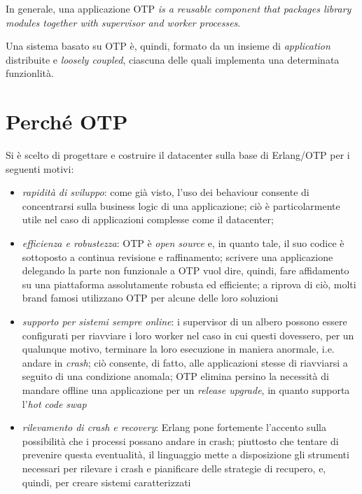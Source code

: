 %
In generale, una applicazione OTP \emph{is a reusable component that packages library modules 
together with supervisor and worker processes}\cite{cesarini09}.

%
Una sistema basato su OTP \`e, quindi, formato da un insieme di \emph{application} distribuite 
e \emph{loosely coupled}, ciascuna delle quali implementa una determinata funzionlit\`a.
%

%
\section{Perch\'e OTP}
%
Si \`e scelto di progettare e costruire il datacenter sulla base di Erlang/OTP per i 
seguenti motivi:
%
\begin{itemize}
\item \emph{rapidit\`a di sviluppo}: come gi\`a visto, l'uso dei behaviour consente 
      di concentrarsi sulla business logic di una applicazione; ci\`o \`e particolarmente 
      utile nel caso di applicazioni complesse come il datacenter; 
%
\item \emph{efficienza e robustezza}: OTP \`e \emph{open source} e, in quanto tale, 
      il suo codice \`e sottoposto a continua revisione e raffinamento; scrivere 
      una applicazione delegando la parte non funzionale a OTP vuol dire, quindi, 
      fare affidamento su una piattaforma assolutamente robusta ed efficiente; 
      a riprova di ci\`o, molti brand famosi utilizzano OTP per alcune delle loro
      soluzioni\cite{whouseserlang}
%
\item \emph{supporto per sistemi sempre online}: i supervisor di un albero possono essere 
      configurati per riavviare i loro worker nel caso in cui questi dovessero, per 
      un qualunque motivo, terminare la loro esecuzione in maniera anormale, i.e. 
      andare in \emph{crash}; ci\`o consente, di fatto, alle applicazioni stesse di
      riavviarsi a seguito di una condizione anomala; OTP elimina persino la necessit\`a
      di mandare offline una applicazione per un \emph{release upgrade}, in quanto 
      supporta l'\emph{hot code swap}
%
\item \emph{rilevamento di crash e recovery}: Erlang pone fortemente l'accento sulla 
      possibilit\`a che i processi possano andare in crash; piuttosto che tentare 
      di prevenire questa eventualit\`a, il linguaggio mette a disposizione gli 
      strumenti necessari per  rilevare i crash e  pianificare 
      delle strategie di recupero, e, quindi, per creare sistemi caratterizzati 

\end{itemize}
